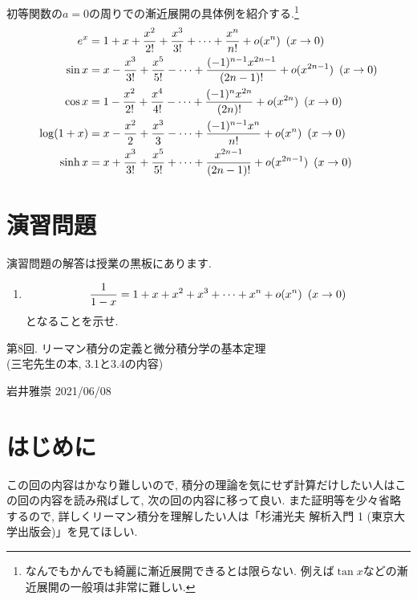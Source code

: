 \documentclass[dvipdfmx,a4paper,11pt]{article}
\theoremstyle{definition}
\begin{document}
 初等関数の$a=0$の周りでの漸近展開の具体例を紹介する.\footnote{なんでもかんでも綺麗に漸近展開できるとは限らない. 例えば$\tan x$などの漸近展開の一般項は非常に難しい.}
\begin{align*}
\begin{split}
e^x &= 1 + x+  \frac{x^2}{2!} + \frac{x^3}{3!}  + \cdots  + 
 \frac{ x^{n}}{n!} + o(x^{n}) \text{\,\,\,}(x \rightarrow 0) \\
\sin x &= x - \frac{x^3}{3!} + \frac{x^5}{5!} - \cdots  + 
 \frac{(-1)^{n-1} x^{2n-1}}{(2n-1)!} 
 + o(x^{2n-1}) \text{\,\,\,}(x \rightarrow 0) \\
 \cos x &= 1 - \frac{x^2}{2!} + \frac{x^4}{4!} - \cdots  + 
 \frac{(-1)^{n} x^{2n}}{(2n)!} 
 + o(x^{2n}) \text{\,\,\,}(x \rightarrow 0) \\
 \log(1+x) &= x - \frac{x^2}{2} + \frac{x^3}{3}  - \cdots   
 + \frac{ (-1)^{n-1}x^{n}}{n!} + o(x^{n}) \text{\,\,\,}(x \rightarrow 0) \\
  \sinh x &= x + \frac{x^3}{3!} + \frac{x^5}{5!} + \cdots  + 
 \frac{x^{2n-1}}{(2n-1)!} 
 + o(x^{2n-1}) \text{\,\,\,}(x \rightarrow 0) \\
\end{split}
\end{align*}

 
\section{演習問題}
演習問題の解答は授業の黒板にあります.
\begin{enumerate}
\item 
$$
\frac{1}{1-x} = 1 + x+  x^2 + x^3  + \cdots   
 + x^{n} + o(x^{n}) \text{\,\,\,}(x \rightarrow 0) 
$$
となることを示せ.

\end{enumerate}

\newpage

\begin{center}
{\Large 第8回. リーマン積分の定義と微分積分学の基本定理 \\ (三宅先生の本, 3.1と3.4の内容)}
\end{center}

\begin{flushright}
 岩井雅崇 2021/06/08
\end{flushright}


\section{はじめに}
 この回の内容はかなり難しいので, 積分の理論を気にせず計算だけしたい人はこの回の内容を読み飛ばして, 次の回の内容に移って良い.
 また証明等を少々省略するので, 詳しくリーマン積分を理解したい人は「杉浦光夫 解析入門 1 (東京大学出版会)」を見てほしい.
 
\end{document}
